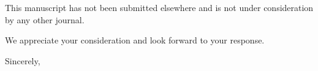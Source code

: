 \documentclass[aps,pra,preprint]{revtex4-2}
\begin{document}
\vspace{1em}

\noindent
This manuscript has not been submitted elsewhere and is not under
consideration by any other journal.

\vspace{1em}

\noindent
We appreciate your consideration and look forward to your response.

\vspace{2em}

\noindent
Sincerely,

\vspace{0.5em}

\\
[Institution]
\end{document}
